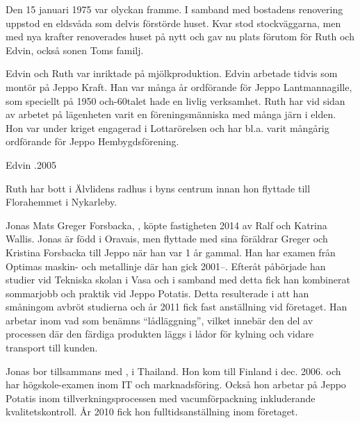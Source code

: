 Den 15 januari 1975 var olyckan framme. I samband med bostadens renovering uppstod en eldsvåda som delvis förstörde huset. Kvar stod
stockväggarna, men med nya krafter renoverades huset på nytt och gav nu plats förutom för Ruth och Edvin, också sonen Toms familj.

Edvin och Ruth var inriktade på mjölkproduktion. Edvin arbetade tidvis som montör på Jeppo Kraft. Han var många år ordförande för Jeppo Lantmannagille, som speciellt på 1950 och-60talet hade en livlig verksamhet. Ruth har vid sidan av arbetet på lägenheten varit en föreningsmänniska med många järn i elden. Hon var under kriget engagerad i Lottarörelsen och har bl.a. varit mångårig ordförande för Jeppo Hembygdsförening.

Edvin .2005

Ruth har bott i Älvlidens radhus i byns centrum innan hon flyttade till Florahemmet i Nykarleby.



%



%
Jonas Mats Greger Forsbacka, , köpte fastigheten 2014 av Ralf och Katrina Wallis. Jonas är född i Oravais, men flyttade med sina föräldrar Greger och Kristina Forsbacka till Jeppo när han var 1 år gammal. Han har examen från Optimas  maskin- och metallinje där han gick 2001--. Efteråt påbörjade han studier vid Tekniska skolan i Vasa och i samband med detta fick han kombinerat sommarjobb och praktik vid Jeppo Potatis. Detta resulterade i att han småningom avbröt studierna och år 2011 fick fast anställning vid företaget. Han arbetar inom vad som benämns ``lådläggning'', vilket innebär den del av processen där den färdiga produkten läggs i lådor för kylning och vidare transport till kunden.

Jonas bor tillsammans med ,  i Thailand. Hon kom till Finland i dec. 2006. och har högskole-examen inom IT och marknadsföring. Också hon arbetar på Jeppo Potatis inom tillverkningsprocessen med vacumförpackning inkluderande kvalitetskontroll. År 2010 fick hon fulltidsanställning inom företaget.


